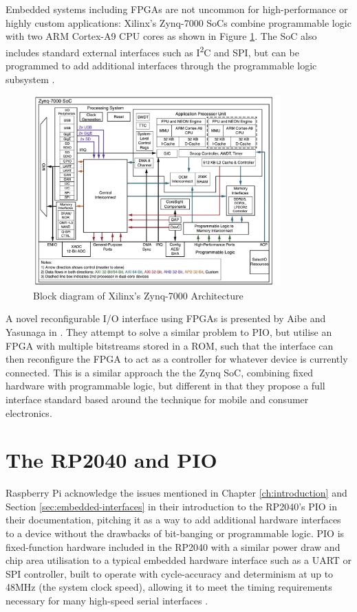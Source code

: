 Embedded systems including FPGAs are not uncommon for high-performance or highly custom applications: Xilinx's Zynq-7000 SoCs combine programmable logic with two ARM Cortex-A9 CPU cores as shown in Figure \ref{fig:zynq}. The SoC also includes standard external interfaces such as I\textsuperscript{2}C and SPI, but can be programmed to add additional interfaces through the programmable logic subsystem \cite{zynq}.

\begin{figure}[H]
    \centering
    \includegraphics[width=0.85\textwidth]{../img/zynq.png}
    \caption{Block diagram of Xilinx's Zynq-7000 Architecture \cite{zynq}}
    \label{fig:zynq}
\end{figure}

A novel reconfigurable I/O interface using FPGAs is presented by Aibe and Yasunaga in \cite{metaio}. They attempt to solve a similar problem to PIO, but utilise an FPGA with multiple bitstreams stored in a ROM, such that the interface can then reconfigure the FPGA to act as a controller for whatever device is currently connected. This is a similar approach the the Zynq SoC, combining fixed hardware with programmable logic, but different in that they propose a full interface standard based around the technique for mobile and consumer electronics.

\section{The RP2040 and PIO}
Raspberry Pi acknowledge the issues mentioned in Chapter \ref{ch:introduction} and Section \ref{sec:embedded-interfaces} in their introduction to the RP2040's PIO in their documentation, pitching it as a way to add additional hardware interfaces to a device without the drawbacks of bit-banging or programmable logic. PIO is fixed-function hardware included in the RP2040 with a similar power draw and chip area utilisation to a typical embedded hardware interface such as a UART or SPI controller, built to operate with cycle-accuracy and determinism at up to 48MHz (the system clock speed), allowing it to meet the timing requirements necessary for many high-speed serial interfaces \cite{rp2040}.

